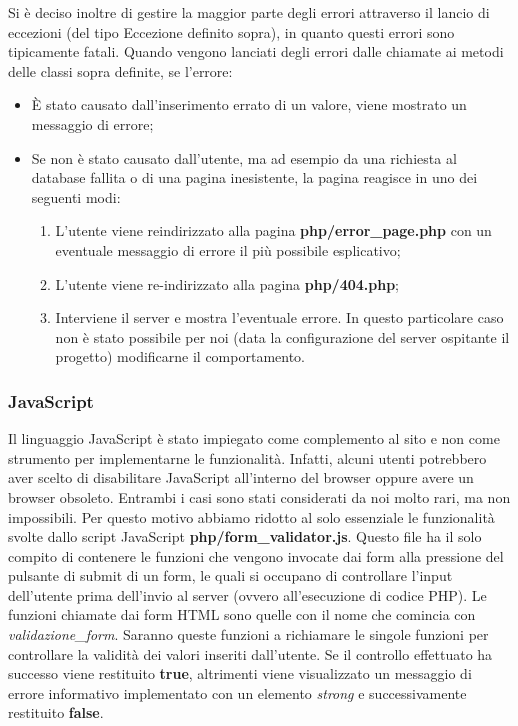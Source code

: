 \documentclass[1_relazione.tex]{subfiles}
\begin{document}
Si è deciso inoltre di gestire la maggior parte degli errori attraverso il lancio di eccezioni (del tipo Eccezione definito sopra), in quanto questi errori sono tipicamente fatali.
Quando vengono lanciati degli errori dalle chiamate ai metodi delle classi sopra definite, se l'errore:
\begin{itemize}
    \item \`{E} stato causato dall'inserimento errato di un valore, viene mostrato un messaggio di errore;
    \item Se non \`{e} stato causato dall'utente, ma ad esempio da una richiesta al database fallita o di una pagina inesistente, la pagina reagisce in uno dei seguenti modi:
    \begin{enumerate}
        \item L'utente viene reindirizzato alla pagina \textbf{php/error\_page.php} con un eventuale messaggio di errore il più possibile esplicativo;
        \item L'utente viene re-indirizzato alla pagina \textbf{php/404.php};
        \item Interviene il server e mostra l'eventuale errore. In questo particolare caso non è stato possibile per noi (data la configurazione del server ospitante il progetto) modificarne il comportamento.
    \end{enumerate}
\end{itemize}

\subsubsection{JavaScript}
Il linguaggio JavaScript \`{e} stato impiegato come complemento al sito e non come strumento per implementarne le funzionalità.
Infatti, alcuni utenti potrebbero aver scelto di disabilitare JavaScript all'interno del browser oppure avere un browser obsoleto. Entrambi i casi sono stati considerati da noi molto rari, ma non impossibili.
Per questo motivo abbiamo ridotto al solo essenziale le funzionalità svolte dallo script JavaScript \textbf{php/form\_validator.js}.
Questo file ha il solo compito di contenere le funzioni che vengono invocate dai form alla pressione del pulsante di submit di un form, le quali si occupano di controllare l'input dell'utente prima dell'invio al server (ovvero all'esecuzione di codice PHP).
Le funzioni chiamate dai form HTML sono quelle con il nome che comincia con \textit{validazione\_form}. Saranno queste funzioni a richiamare le singole funzioni per controllare la validit\`{a} dei valori inseriti dall'utente.
Se il controllo effettuato ha successo viene restituito \textbf{true}, altrimenti viene visualizzato un messaggio di errore informativo implementato con un elemento \textit{strong} e successivamente restituito \textbf{false}.
\end{document}
